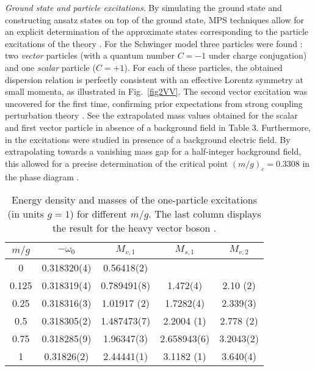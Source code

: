 \documentclass[epj,final]{svjour}
\begin{document}
\emph{Ground state and particle excitations}. By simulating the ground state and constructing ansatz states on top of the ground state, MPS techniques allow for an explicit determination of the approximate states corresponding to the particle excitations of the theory \cite{Haegeman2012}. For the Schwinger model three particles were found \cite{buyens2014matrix}: two \emph{vector} particles (with a quantum number $C=-1$ under charge conjugation) and one \emph{scalar} particle ($C=+1$). For each of these particles, the obtained dispersion relation is perfectly consistent with an effective Lorentz symmetry at small momenta, as illustrated in Fig.~\ref{fig2VV}. The second vector excitation was uncovered for the first time, confirming prior expectations from strong coupling perturbation theory \cite{Coleman1976, Adam1996}. See the extrapolated mass values obtained for the scalar and first vector particle in absence of a background field in Table 3. Furthermore, in \cite{Buyens2015b} the excitations were studied in presence of a background electric field. By extrapolating towards a vanishing mass gap for a half-integer background field, this allowed for a precise determination of the critical point $(m/g)_c=0.3308$ in the phase diagram \cite{Buyens2017b}.

\begin{table}
\begin{tabular}{|c|c|c|c|c|}
\hline
$m/g$ & $- \omega_0$ & $M_{v,1}$ & $M_{s,1}$ & $M_{v,2}$   \\
\hline
0 &0.318320(4)         &  0.56418(2)&   &  \\
0.125&        0.318319(4) &0.789491(8)  &1.472(4)  &2.10 (2)  \\

0.25 &0.318316(3)         &  1.01917 (2)&  1.7282(4)&2.339(3)  \\
0.5 &        0.318305(2) &  1.487473(7)& 2.2004 (1) & 2.778 (2) \\
0.75 &        0.318285(9) &  1.96347(3)& 2.658943(6) &3.2043(2)  \\
1 &0.31826(2)&2.44441(1)         &3.1182 (1)  & 3.640(4)  \\
\hline
\end{tabular}
\caption{Energy density and masses of the one-particle excitations (in units $g=1$) for different $m/g$. The last column displays the result for the heavy vector boson \cite{buyens2014matrix}.}
\end{table}
\end{document}
